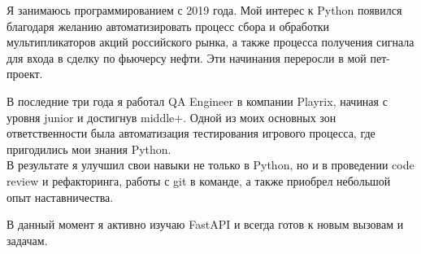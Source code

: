 \documentclass[a4paper, 12pt]{article}
\begin{document}
\setlength\parindent{.3in}

Я занимаюсь программированием с 2019 года. Мой интерес к Python появился благодаря желанию автоматизировать процесс сбора и обработки мультипликаторов акций российского рынка, а также процесса получения сигнала для входа в сделку по фьючерсу нефти.
Эти начинания переросли в мой пет-проект.

В последние три года я работал QA Engineer в компании Playrix, начиная с уровня junior и достигнув middle+.
Одной из моих основных зон ответственности была автоматизация тестирования игрового процесса,
где пригодились мои знания Python.
\\
В результате я улучшил свои навыки не только в Python, но и в проведении code review и рефакторинга,
работы с git в команде, а также приобрел небольшой опыт наставничества.

В данный момент я активно изучаю FastAPI и всегда готов к новым вызовам и задачам.
\end{document}
